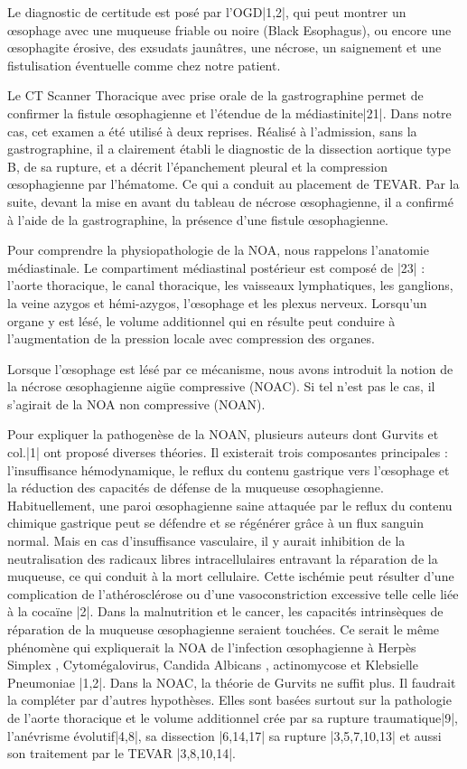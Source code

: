 \documentclass[./tfe.tex]{subfiles}
\begin{document}
Le diagnostic de certitude est posé par l'OGD|1,2|, qui peut montrer un œsophage avec une muqueuse friable ou noire (Black Esophagus), ou encore une œsophagite érosive, des exsudats jaunâtres, une nécrose, un saignement et une fistulisation éventuelle comme chez notre patient.

Le CT Scanner Thoracique avec prise orale de la gastrographine permet de confirmer la fistule œsophagienne et l’étendue de la médiastinite|21|. Dans notre cas, cet examen a été utilisé à deux reprises. Réalisé à l’admission, sans la gastrographine, il a clairement établi le diagnostic de la dissection aortique type B, de sa rupture, et a décrit l’épanchement pleural et la compression œsophagienne par l’hématome. Ce qui a conduit au placement de TEVAR. Par la suite, devant la mise en avant du tableau de nécrose œsophagienne, il a confirmé à l’aide de la gastrographine, la présence d’une fistule œsophagienne.

Pour comprendre la physiopathologie de la NOA, nous rappelons l’anatomie médiastinale. Le compartiment médiastinal postérieur est composé de |23| : l’aorte thoracique, le canal thoracique, les vaisseaux lymphatiques, les ganglions, la veine azygos et hémi-azygos, l’œsophage et les plexus nerveux. Lorsqu’un organe y est lésé, le volume additionnel qui en résulte peut conduire à l’augmentation de la pression locale avec compression des organes.

Lorsque l’œsophage est lésé par ce mécanisme, nous avons introduit la notion de la nécrose œsophagienne aigüe compressive (NOAC). Si tel n’est pas le cas, il s’agirait de la NOA non compressive (NOAN).

Pour expliquer la pathogenèse de la NOAN, plusieurs auteurs dont Gurvits et col.|1| ont proposé diverses théories. Il existerait trois composantes principales : l’insuffisance hémodynamique, le reflux du contenu gastrique vers l’œsophage et la réduction des capacités de défense de la muqueuse œsophagienne. Habituellement, une paroi œsophagienne saine attaquée par le reflux du contenu chimique gastrique peut se défendre et se régénérer grâce à un flux sanguin normal. Mais en cas d’insuffisance vasculaire, il y aurait inhibition de la neutralisation des radicaux libres intracellulaires entravant la réparation de la muqueuse, ce qui conduit à la mort cellulaire. Cette ischémie peut résulter d’une complication de l’athérosclérose ou d’une vasoconstriction excessive telle celle liée à la cocaïne |2|. Dans la malnutrition et le cancer, les capacités intrinsèques de réparation de la muqueuse œsophagienne seraient touchées. Ce serait le même phénomène qui expliquerait la NOA de l’infection œsophagienne à Herpès Simplex , Cytomégalovirus, Candida Albicans , actinomycose et Klebsielle Pneumoniae |1,2|.
Dans la NOAC, la théorie de Gurvits ne suffit plus. Il faudrait la compléter par d’autres hypothèses. Elles sont basées surtout sur la pathologie de l’aorte thoracique et le volume additionnel crée par sa rupture traumatique|9|, l’anévrisme évolutif|4,8|, sa dissection |6,14,17| sa rupture |3,5,7,10,13| et aussi son traitement par le TEVAR |3,8,10,14|.
\end{document}

